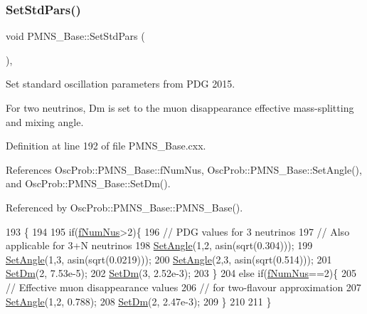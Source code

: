 \subsubsection{\texorpdfstring{Set\+Std\+Pars()}{SetStdPars()}}
{\footnotesize\ttfamily void P\+M\+N\+S\+\_\+\+Base\+::\+Set\+Std\+Pars (\begin{DoxyParamCaption}{ }\end{DoxyParamCaption})\hspace{0.3cm}{\ttfamily [virtual]}, {\ttfamily [inherited]}}

Set standard oscillation parameters from P\+DG 2015.

For two neutrinos, Dm is set to the muon disappearance effective mass-\/splitting and mixing angle. 

Definition at line 192 of file P\+M\+N\+S\+\_\+\+Base.\+cxx.



References Osc\+Prob\+::\+P\+M\+N\+S\+\_\+\+Base\+::f\+Num\+Nus, Osc\+Prob\+::\+P\+M\+N\+S\+\_\+\+Base\+::\+Set\+Angle(), and Osc\+Prob\+::\+P\+M\+N\+S\+\_\+\+Base\+::\+Set\+Dm().



Referenced by Osc\+Prob\+::\+P\+M\+N\+S\+\_\+\+Base\+::\+P\+M\+N\+S\+\_\+\+Base().


\begin{DoxyCode}
193 \{
194 
195   \textcolor{keywordflow}{if}(\hyperlink{classOscProb_1_1PMNS__Base_a24bb74bed63569dfe88b18fa6a08060e}{fNumNus}>2)\{
196     \textcolor{comment}{// PDG values for 3 neutrinos}
197     \textcolor{comment}{// Also applicable for 3+N neutrinos}
198     \hyperlink{classOscProb_1_1PMNS__Base_ace7875cf6d3bec161a2b7ed2690aec34}{SetAngle}(1,2, asin(sqrt(0.304)));
199     \hyperlink{classOscProb_1_1PMNS__Base_ace7875cf6d3bec161a2b7ed2690aec34}{SetAngle}(1,3, asin(sqrt(0.0219)));
200     \hyperlink{classOscProb_1_1PMNS__Base_ace7875cf6d3bec161a2b7ed2690aec34}{SetAngle}(2,3, asin(sqrt(0.514)));
201     \hyperlink{classOscProb_1_1PMNS__Base_a492243b22fb1b783cd2943f507cff970}{SetDm}(2, 7.53e-5);
202     \hyperlink{classOscProb_1_1PMNS__Base_a492243b22fb1b783cd2943f507cff970}{SetDm}(3, 2.52e-3);
203   \}
204   \textcolor{keywordflow}{else} \textcolor{keywordflow}{if}(\hyperlink{classOscProb_1_1PMNS__Base_a24bb74bed63569dfe88b18fa6a08060e}{fNumNus}==2)\{
205     \textcolor{comment}{// Effective muon disappearance values}
206     \textcolor{comment}{// for two-flavour approximation}
207     \hyperlink{classOscProb_1_1PMNS__Base_ace7875cf6d3bec161a2b7ed2690aec34}{SetAngle}(1,2, 0.788);
208     \hyperlink{classOscProb_1_1PMNS__Base_a492243b22fb1b783cd2943f507cff970}{SetDm}(2, 2.47e-3);
209   \}
210 
211 \}
\end{DoxyCode}
\mbox{\label{classOscProb_1_1PMNS__Base_add6533a9fc9acdfc7ae258b62570d78d}} 
